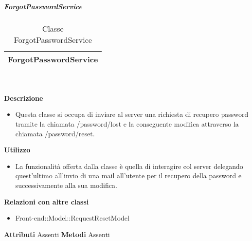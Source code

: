 			\subparagraph{ForgotPasswordService} 
\begin{table}[ht]
\begin{center}
\bgroup
	\setlength{\arrayrulewidth}{0.6mm}
	\def\arraystretch{1}
		\begin{tabular}{ | p{12cm} | }
				\hline  
					\centerline{\textbf{ForgotPasswordService}}
		\\ \hline 
				\hline
				\hline
		
		\end{tabular}
\egroup
\caption{Classe ForgotPasswordService}
\end{center}
\end{table} \textbf{\\ \\ Descrizione}
\begin{itemize}
\item[] Questa classe si occupa di inviare al server una richiesta di recupero password tramite la chiamata /password/lost e la conseguente modifica attraverso la chiamata /password/reset.
\end{itemize} 
\textbf{Utilizzo}
\begin{itemize}
\item[] La  funzionalità offerta dalla classe è quella di interagire col server delegando quest'ultimo all'invio di una mail all'utente per il recupero della password e successivamente alla sua modifica.
\end{itemize}
\textbf{Relazioni con altre classi}
\begin{itemize}
\item{Front-end::Model::RequestResetModel}
\end{itemize}
\textbf{Attributi}
Assenti
\textbf{Metodi}
Assenti

